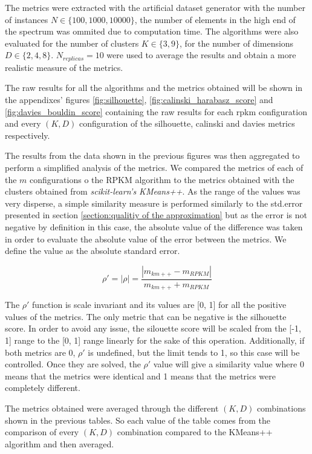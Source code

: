 The metrics were extracted with the artificial dataset generator with the number of instances $N \in \{100, 1000, 10000\}$, the number of elements in the high end of the spectrum was ommited due to computation time. The algorithms were also evaluated for the number of clusters $K \in \{3, 9\}$, for the number of dimensions $D \in \{2, 4, 8\}$. $N_{replicas}=10$ were used to average the results and obtain a more realistic measure of the metrics.

The raw results for all the algorithms and the metrics obtained will be shown in the appendixes' figures \ref{fig:silhouette}, \ref{fig:calinski_harabasz_score} and \ref{fig:davies_bouldin_score} containing the raw results for each rpkm configuration and every $(K, D)$ configuration of the silhouette, calinski and davies metrics respectively.

The results from the data shown in the previous figures was then aggregated to perform a simplified analysis of the metrics. We compared the metrics of each of the $m$ configurations o the RPKM algorithm to the metrics obtained with the clusters obtained from \textit{scikit-learn's KMeans++}. As the range of the values was very disperse, a simple similarity measure is performed similarly to the std.error presented in section \ref{section:qualitiy of the approximation} but as the error is not negative by definition in this case, the absolute value of the difference was taken in order to evaluate the absolute value of the error between the metrics. We define the value as the absolute standard error.

$$\rho' = |\rho| = \frac{|m_{km++} - m_{RPKM}|}{m_{km++} + m_{RPKM}}$$

The $\rho'$ function is scale invariant and its values are [0, 1] for all the positive values of the metrics. The only metric that can be negative is the silhouette score. In order to avoid any issue, the silouette score will be scaled from the [-1, 1] range to the [0, 1] range linearly for the sake of this operation. Additionally, if both metrics are 0, $\rho'$ is undefined, but the limit tends to 1, so this case will be controlled. Once they are solved, the $\rho'$ value will give a similarity value where 0 means that the metrics were identical and 1 means that the metrics were completely different.

The metrics obtained were averaged through the different $(K, D)$ combinations shown in the previous tables. So each value of the table comes from the comparison of every $(K, D)$ combination compared to the KMeans++ algorithm and then averaged.

